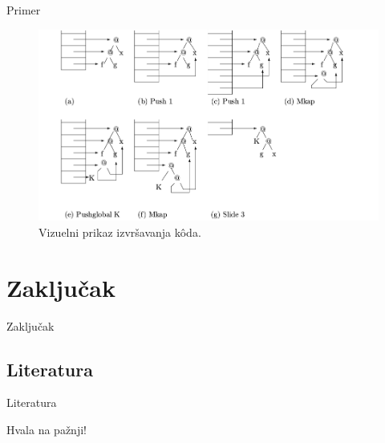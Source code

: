 \documentclass[xcolor={dvipsnames}, 11pt]{beamer}
\begin{document}
\begin{frame}{Primer}
	\begin{figure}[h!]
		\centering
		\includegraphics[scale=0.35]{primerGmasine.png}
		\caption{Vizuelni prikaz izvršavanja k\^ oda.}
		\label{fig:primerGmasine}
	\end{figure}

\end{frame}

\section{Zaključak}
\begin{frame}{Zaključak}
	
\end{frame}


\subsection{Literatura}
\begin{frame}{Literatura}
	
\end{frame}

\begin{frame}
	Hvala na pažnji!
\end{frame}
	
	
\end{document}
